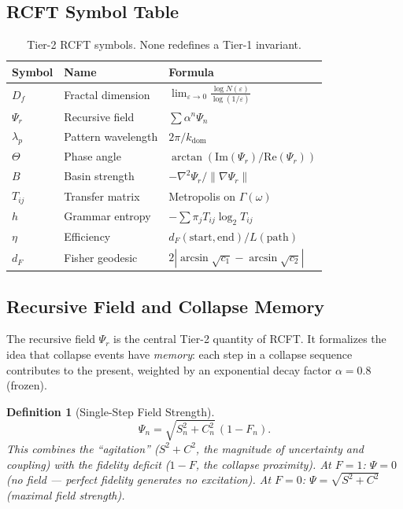 \documentclass[
  aps,
  prd,
  preprint,
  superscriptaddress,
  nofootinbib,
  floatfix,
  longbibliography
]{revtex4-2}
\newtheorem{definition}[theorem]{Definition}
\newcommand{\Gam}{\Gamma}
\newcommand{\eps}{\varepsilon}
\newcommand{\beq}{\begin{equation}}
\newcommand{\eeq}{\end{equation}}
\newcommand{\Fid}{F}
\newcommand{\Drft}{\omega}
\newcommand{\Ent}{S}
\newcommand{\Curv}{C}
\newcommand{\Psifield}{\Psi}
\newcommand{\Psirec}{\Psi_{r}}
\newcommand{\dFisher}{d_{\!F}}
\begin{document}
\subsection{RCFT Symbol Table}

\begin{table}[t]
\centering
\small
\caption{Tier-2 RCFT symbols. None redefines a Tier-1 invariant.}
\label{tab:rcft_symbols}
\begin{tabular}{@{}lll@{}}
\toprule
\textbf{Symbol} & \textbf{Name} & \textbf{Formula} \\
\midrule
$D_f$ & Fractal dimension &
  $\lim_{\eps\to 0} \frac{\log N(\eps)}{\log(1/\eps)}$ \\[4pt]
$\Psirec$ & Recursive field &
  $\sum \alpha^n \Psifield_n$ \\[4pt]
$\lambda_p$ & Pattern wavelength &
  $2\pi / k_{\mathrm{dom}}$ \\[4pt]
$\Theta$ & Phase angle &
  $\arctan(\mathrm{Im}(\Psirec)/\mathrm{Re}(\Psirec))$ \\[4pt]
$B$ & Basin strength &
  $-\nabla^2\Psirec / \|\nabla\Psirec\|$ \\[4pt]
$T_{ij}$ & Transfer matrix &
  Metropolis on $\Gam(\Drft)$ \\[4pt]
$h$ & Grammar entropy &
  $-\sum \pi_j T_{ij} \log_2 T_{ij}$ \\[4pt]
$\eta$ & Efficiency &
  $\dFisher(\mathrm{start}, \mathrm{end}) / L(\mathrm{path})$ \\[4pt]
$\dFisher$ & Fisher geodesic &
  $2|\arcsin\sqrt{c_1} - \arcsin\sqrt{c_2}|$ \\
\bottomrule
\end{tabular}
\end{table}

\subsection{Recursive Field and Collapse Memory}

The recursive field $\Psirec$ is the central Tier-2
quantity of RCFT.
It formalizes the idea that collapse events have
\emph{memory}: each step in a collapse sequence
contributes to the present, weighted by an exponential
decay factor $\alpha = 0.8$ (frozen).

\begin{definition}[Single-Step Field Strength]\label{def:psi_single}
\beq
  \Psifield_n = \sqrt{\Ent_n^2 + \Curv_n^2}\,(1 - \Fid_n).
\eeq
This combines the ``agitation'' ($\Ent^2 + \Curv^2$, the
magnitude of uncertainty and coupling) with the fidelity
deficit ($1 - \Fid$, the collapse proximity).
At $\Fid = 1$: $\Psifield = 0$ (no field — perfect fidelity
generates no excitation).
At $\Fid = 0$: $\Psifield = \sqrt{\Ent^2 + \Curv^2}$
(maximal field strength).
\end{definition}
\end{document}
